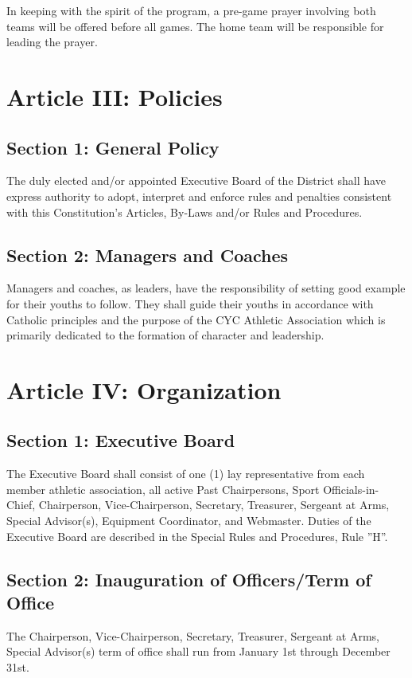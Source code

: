 \documentclass[10pt,oneside,draft]{memoir}
\begin{document}
In keeping with the spirit of the program, a pre-game prayer involving both teams will be offered before all games. The home team will be responsible for leading the prayer.

\section{Article III: Policies}
\subsection{Section 1: General Policy}
The duly elected and/or appointed Executive Board of the District shall have express authority to adopt, interpret and enforce rules and penalties consistent with this Constitution’s Articles, By-Laws and/or Rules and Procedures.

\subsection{Section 2: Managers and Coaches}
Managers and coaches, as leaders, have the responsibility of setting good example for their youths to follow.  They  shall guide their youths in accordance with Catholic principles and the purpose of the CYC Athletic Association  which is primarily dedicated to the formation of character and leadership.

\section{Article IV: Organization}
\subsection{Section 1: Executive Board}
The Executive Board shall consist of one (1) lay representative from each member athletic association, all active Past Chairpersons, Sport Officials-in-Chief, Chairperson, Vice-Chairperson, Secretary, Treasurer, Sergeant at Arms, Special Advisor(s), Equipment Coordinator, and Webmaster.  Duties of the Executive Board are described in the Special Rules and Procedures, Rule ”H”.

\subsection{Section 2: Inauguration of Officers/Term of Office}
The Chairperson, Vice-Chairperson, Secretary, Treasurer, Sergeant at Arms, Special Advisor(s) term of office shall run from January 1st through December 31st.  
\end{document}

